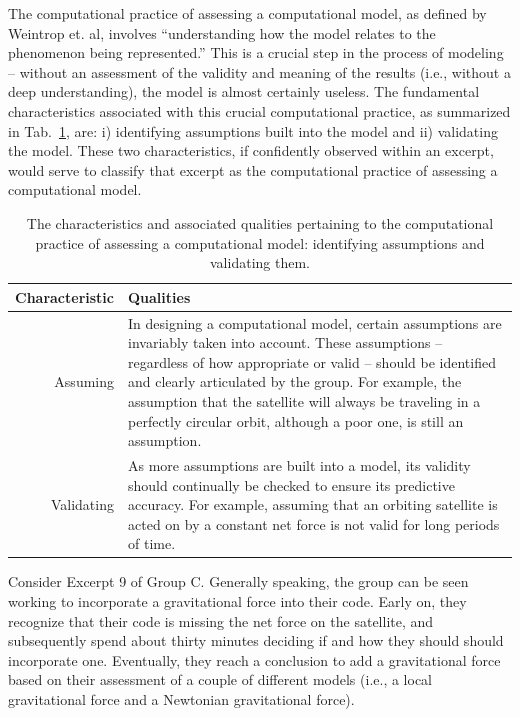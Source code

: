 \documentclass{msuphddissertation}
\begin{document}
\begin{doublespace}
The computational practice of assessing a computational model, as defined by Weintrop et. al, involves ``understanding how the model relates to the phenomenon being represented.''  This is a crucial step in the process of modeling -- without an assessment of the validity and meaning of the results (i.e., without a deep understanding), the model is almost certainly useless.  The fundamental characteristics associated with this crucial computational practice, as summarized in Tab.~\ref{CH5:AssessingModels}, are: i) identifying assumptions built into the model and ii) validating the model.  These two characteristics, if confidently observed within an excerpt, would serve to classify that excerpt as the computational practice of assessing a computational model.

\begin{table}
\begin{tabular}{r|p{}}
Characteristic & Qualities \\\hline\hline
Assuming & In designing a computational model, certain assumptions are invariably taken into account.  These assumptions -- regardless of how appropriate or valid -- should be identified and clearly articulated by the group.  For example, the assumption that the satellite will always be traveling in a perfectly circular orbit, although a poor one, is still an assumption.\\
Validating & As more assumptions are built into a model, its validity should continually be checked to ensure its predictive accuracy.  For example, assuming that an orbiting satellite is acted on by a constant net force is not valid for long periods of time.\\
\end{tabular}\caption{The characteristics and associated qualities pertaining to the computational practice of assessing a computational model: identifying assumptions and validating them.}\label{CH5:AssessingModels}
\end{table}

Consider Excerpt 9 of Group C.  Generally speaking, the group can be seen working to incorporate a gravitational force into their code.  Early on, they recognize that their code is missing the net force on the satellite, and subsequently spend about thirty minutes deciding if and how they should should incorporate one.  Eventually, they reach a conclusion to add a gravitational force based on their assessment of a couple of different models (i.e., a local gravitational force and a Newtonian gravitational force).


\end{doublespace}
\end{document}
